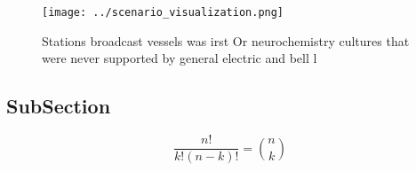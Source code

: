 \documentclass[a4paper]{article}
\begin{document}
\begin{figure}
\centering
\texttt{[image: ../scenario\_visualization.png]}
\caption{Stations broadcast vessels was irst Or neurochemistry cultures that were never supported by general electric and bell l
}
\end{figure}
 
\subsection{SubSection}

\[ \frac{n!}{k!(n-k)!} = \binom{n}{k} \]
\end{document}
